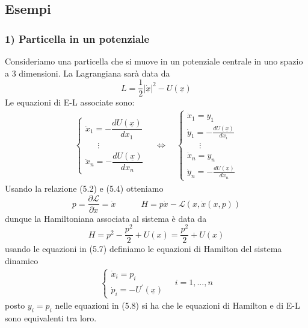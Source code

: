 \subsection{Esempi}

\subsubsection{1) Particella in un potenziale}

Consideriamo una particella che si muove in un potenziale centrale in uno spazio a 3 dimensioni. La Lagrangiana sar\`{a} data da
\begin{equation*}
	L = \dfrac{1}{2}|\underline{\dot x}|^2 - U(\underline{x})
\end{equation*}
Le equazioni di E-L associate sono:
\begin{align}
	\begin{cases}
		\ddot x_1 = -\dfrac{dU(\underline{x})}{dx_1} \\
		\quad \;\,\vdots \\
		\ddot x_n = -\dfrac{dU(\underline{x})}{dx_n} 
	\end{cases}
	\quad \iff \quad
	\begin{cases}
		\dot x_1 = y_1 \\
		\dot y_1 = -\frac{dU(\underline{x})}{dx_i}\\
		\quad \;\,\vdots \\
		\dot x_n = y_n \\
		\dot y_n = - \frac{dU(\underline{x})}{dx_n}
	\end{cases}
\end{align}	
Usando la relazione (5.2) e (5.4) otteniamo
\begin{equation*}
	p=\frac{\partial \mathcal{L}}{\partial \dot{x}}=\dot{x} \quad \quad  \quad H=p \dot{x}-\mathcal{L}(x, \dot{x}(x, p))
\end{equation*}
dunque la Hamiltoniana associata al sistema \`{e} data da 
\begin{equation*}
H=p^2-\frac{p^2}{2}+U(x)=\frac{p^2}{2}+U(x)	
\end{equation*}
usando le equazioni in (5.7) definiamo le equazioni di Hamilton del sistema dinamico 
\begin{align*}
	\begin{cases}
		\dot x_i=p_i \\
		\dot p_i=-U^{\prime}(\underline{x})
	\end{cases}
	\quad i = 1,...,n
\end{align*}
posto $y_i = p_i$ nelle equazioni in (5.8) si ha che le equazioni di Hamilton e di E-L sono equivalenti tra loro.

